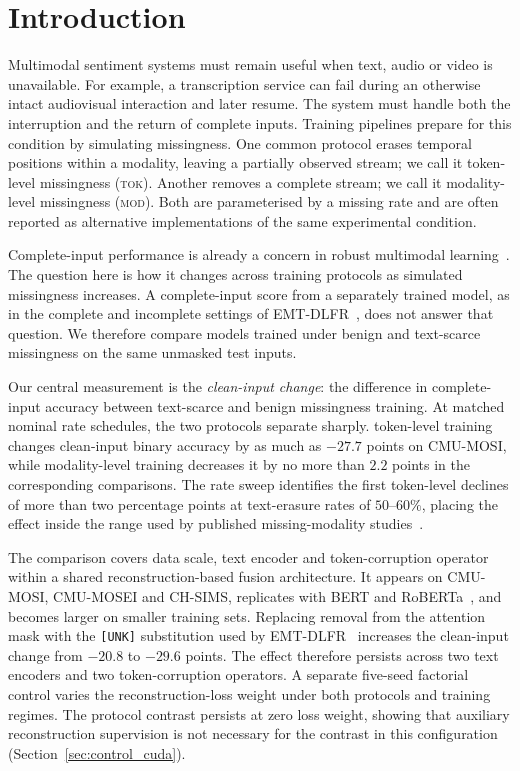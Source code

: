 \documentclass[preprint,11pt]{elsarticle}
\newcommand{\tokenlevel}{token-level}
\newcommand{\modlevel}{modality-level}
\newcommand{\IMM}{\textsc{tok}}          %
\newcommand{\FMM}{\textsc{mod}}          %
\begin{document}
\section{Introduction}

Multimodal sentiment systems must remain useful when text, audio or video is
unavailable. For example, a transcription service can fail during an otherwise
intact audiovisual interaction and later resume. The system must handle both
the interruption and the return of complete inputs. Training pipelines prepare
for this condition by simulating
missingness. One common protocol erases temporal positions within a modality,
leaving a partially observed stream; we call it \tokenlevel{} missingness
(\IMM{}). Another removes a complete stream; we call it \modlevel{}
missingness (\FMM{}). Both are parameterised by a missing rate and are often
reported as alternative implementations of the same experimental condition.

Complete-input performance is already a concern in robust multimodal
learning~\cite{hazarika2022,missmodal}. The question here is how it changes
across training protocols as simulated missingness increases. A
complete-input score from a separately trained model, as in the complete and
incomplete settings of EMT-DLFR~\cite{emtdlfr}, does not answer that question.
We therefore compare models trained under benign and text-scarce missingness
on the same unmasked test inputs.

Our central measurement is the \emph{clean-input change}: the difference in
complete-input accuracy between text-scarce and benign missingness training.
At matched nominal rate schedules,
the two protocols separate sharply. \tokenlevel{} training changes clean-input
binary accuracy by as much as $-27.7$ points on CMU-MOSI, while \modlevel{}
training decreases it by no more than $2.2$ points in the corresponding comparisons.
The rate sweep identifies the first token-level declines of more than two
percentage points at text-erasure rates of $50$--$60\%$,
placing the effect inside the range used by published missing-modality
studies~\cite{emtdlfr,mrcf}.

The comparison covers data scale, text encoder and token-corruption operator
within a shared reconstruction-based fusion architecture.
It appears on CMU-MOSI, CMU-MOSEI and CH-SIMS, replicates with BERT and
RoBERTa~\cite{bert,roberta}, and becomes larger on smaller training sets.
Replacing removal from the attention mask with the \texttt{[UNK]}
substitution used by EMT-DLFR~\cite{emtdlfr} increases the clean-input change
from $-20.8$ to $-29.6$ points. The effect therefore persists across two text
encoders and two token-corruption operators. A separate five-seed factorial
control varies the reconstruction-loss weight under both protocols and
training regimes. The protocol contrast persists at zero loss weight,
showing that auxiliary reconstruction supervision is not necessary for the
contrast in this configuration (Section~\ref{sec:control_cuda}).
\end{document}
